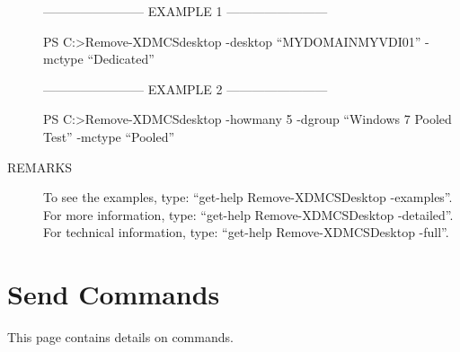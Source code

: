 \documentclass[letterpaper,10pt,english]{sphinxmanual}
\begin{document}
\begin{description}
\begin{description}
\end{description}

————————\textendash{} EXAMPLE 1 ————————\textendash{}

PS C:\textgreater{}Remove-XDMCSdesktop -desktop “MYDOMAINMYVDI01” -mctype “Dedicated”

————————\textendash{} EXAMPLE 2 ————————\textendash{}

PS C:\textgreater{}Remove-XDMCSdesktop -howmany 5 -dgroup “Windows 7 Pooled Test” -mctype “Pooled”

\item[{REMARKS}] \leavevmode
To see the examples, type: “get-help Remove-XDMCSDesktop -examples”.
For more information, type: “get-help Remove-XDMCSDesktop -detailed”.
For technical information, type: “get-help Remove-XDMCSDesktop -full”.

\end{description}


\chapter{Send Commands}
\label{\detokenize{cmd_send:send-commands}}\label{\detokenize{cmd_send::doc}}
This page contains details on  commands.
\end{document}

